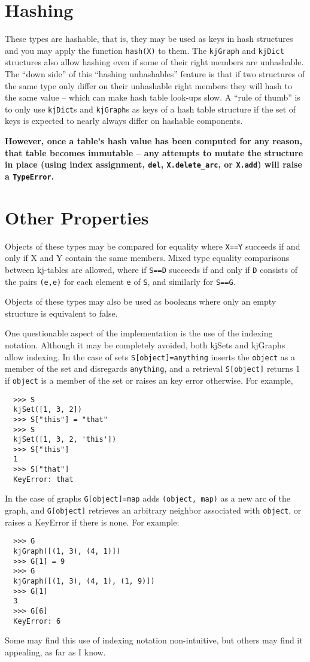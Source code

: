 \section{Hashing}

These types are hashable, that is, they may
be used as keys in hash structures and you may apply the
function {\tt hash(X)} to them.  The {\tt kjGraph}
and {\tt kjDict} structures also allow
hashing even if some of their right members are unhashable.
The ``down side'' of this ``hashing unhashables'' feature is
that if two structures of the same type only differ on their
unhashable right members they will hash to the same value --
which can make hash table look-ups slow.  A ``rule of thumb''
is to only use {\tt kjDict}s and {\tt kjGraph}s as keys of
a hash table structure if the set of keys is expected to 
nearly always differ
on hashable components.

{\bf However, once a table's
hash value has been computed for any reason, that table becomes
immutable -- any attempts to mutate the structure in place
(using index assignment, {\tt del}, 
{\tt X.delete\_arc}, or {\tt X.add})
will raise a {\tt TypeError}.}

\section{Other Properties}

Objects of these types may be compared
for equality where {\tt X==Y} succeeds if and only if X and Y
contain the same members.  Mixed type equality comparisons 
between kj-tables are
allowed, where if {\tt S==D} succeeds if and only if {\tt D}
consists of the pairs {\tt (e,e)} for each element {\tt e}
of {\tt S}, and similarly for {\tt S==G}.

Objects of these types may also be
used as booleans where only an empty structure is equivalent to
false.

One questionable aspect of the implementation is the use of 
the indexing notation.  Although it may be completely avoided,
both kjSets and kjGraphs allow indexing.  In the case of sets
{\tt S[object]=anything} inserts the {\tt object} as a member of the
set and disregards {\tt anything}, and a retrieval {\tt S[object]}
returns 1 if {\tt object} is a member of the set or raises an
key error otherwise.  For example,
\begin{verbatim}
  >>> S
  kjSet([1, 3, 2])
  >>> S["this"] = "that"
  >>> S
  kjSet([1, 3, 2, 'this'])
  >>> S["this"]
  1
  >>> S["that"]
  KeyError: that
\end{verbatim}
In the case of graphs {\tt G[object]=map} adds {\tt (object, map)}
as a new arc of the graph, and {\tt G[object]} retrieves an
arbitrary neighbor associated with  {\tt object}, or raises
a KeyError if there is none.  For example:
\begin{verbatim}
  >>> G
  kjGraph([(1, 3), (4, 1)])
  >>> G[1] = 9
  >>> G
  kjGraph([(1, 3), (4, 1), (1, 9)])
  >>> G[1]
  3
  >>> G[6]
  KeyError: 6
\end{verbatim}
Some may find this use of indexing notation non-intuitive, but
others may find it appealing, as far as I know.

